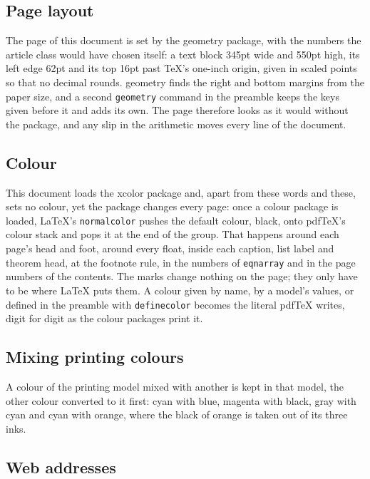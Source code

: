 \documentclass{article}
\numberwithin{equation}{section}
\theoremstyle{definition}
\theoremstyle{remark}
\begin{document}
\subsection{Page layout}\label{sec:geometry}

The page of this document is set by the geometry package, with the numbers the article
class would have chosen itself: a text block 345pt wide and 550pt high, its left edge
62pt and its top 16pt past \TeX's one-inch origin, given in scaled points so that no
decimal rounds. geometry finds the right and bottom margins from the paper size, and a
second \texttt{geometry} command in the preamble keeps the keys given before it and
adds its own. The page therefore looks as it would without the package, and any slip in
the arithmetic moves every line of the document.

\subsection{Colour}\label{sec:color}

This document loads the xcolor package and, apart from \textcolor{rtblue}{these words}
and {\color[RGB]{153,0,0} these}, sets no colour, yet the package changes every page: once a colour package is loaded, \LaTeX's \texttt{normalcolor} pushes the default
colour, black, onto pdf\TeX's colour stack and pops it at the end of the group. That
happens around each page's head and foot, around every float, inside each caption, list
label and theorem head, at the footnote rule, in the numbers of \texttt{eqnarray} and in
the page numbers of the contents. The marks change nothing on the page; they only have to
be where \LaTeX{} puts them. A colour given by name, by a model's values, or defined in the
preamble with \texttt{definecolor} becomes the literal pdf\TeX{} writes, digit for digit as
the colour packages print it.

\subsection{Mixing printing colours}\label{sec:cmykmix}
A colour of the printing model mixed with another is kept in that model, the other colour
converted to it first: \textcolor{cyan!55!blue}{cyan with blue}, \textcolor{magenta!60!black}{magenta
with black}, \textcolor{gray!40!cyan}{gray with cyan} and \textcolor{cyan!33!orange}{cyan with
orange}, where the black of orange is taken out of its three inks.

\subsection{Web addresses}\label{sec:url}
\end{document}
